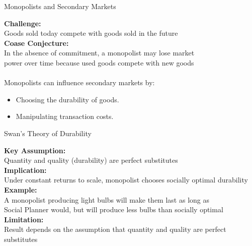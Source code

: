 \documentclass[aspectratio=169]{beamer}  %
\begin{document}
\begin{frame}{Monopolists and Secondary Markets}{}
\begin{spacing}{1.5}
{\small
    \textbf{Challenge:} \\
    Goods sold today compete with goods sold in the future \\

    {\textbf{Coase Conjecture:}\\
    In the absence of commitment, a monopolist may lose market \\power over time because used goods compete with new goods\\}
\quad\\
    Monopolists can influence secondary markets by:
    \begin{itemize}
        \item Choosing the durability of goods.
        \item Manipulating transaction costs.
    \end{itemize}

    }
\end{spacing}
\end{frame}

\begin{frame}{Swan's Theory of Durability}{}
\begin{spacing}{1.75}
{\small
    \textbf{Key Assumption:}\\
    Quantity and quality (durability) are perfect substitutes\\

    \textbf{Implication:} \\
    Under constant returns to scale, monopolist chooses socially optimal  durability\\

    \textbf{Example:} \\
    A monopolist producing light bulbs will make them last as long as\\
    Social Planner would, but will produce less bulbs than socially optimal\\

    \textbf{Limitation:}\\
    Result depends on the assumption that quantity and quality are perfect substitutes

    }
\end{spacing}
\end{frame}
\end{document}
